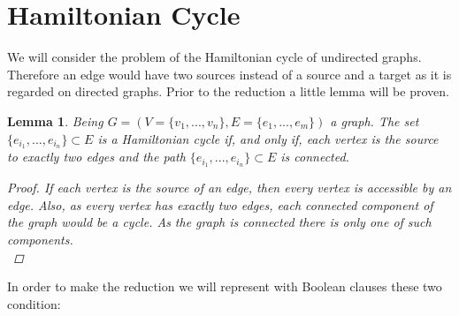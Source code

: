 \documentclass[11pt,a4paper]{article}
\title{}
\author{}
\date{}
\newtheorem{lemma}[theorem]{Lemma}
\theoremstyle{definition}
\begin{document}
\maketitle
\section{Hamiltonian Cycle}

We will consider the problem of the Hamiltonian cycle of undirected graphs. Therefore an edge would have two sources instead of a source and a target as it is regarded on directed graphs. Prior to the reduction a little lemma will be proven.

\begin{lemma} Being $G=(V=\{ v_1,...,v_n\},E= \{e_1,...,e_m\})$ a graph. The set $ \{e_{i_1},...,e_{i_n}\}\subset E$ is a Hamiltonian cycle if, and only if, each vertex is the source to exactly two edges and the path  $ \{e_{i_1},...,e_{i_n}\}\subset E$ is connected.

\begin{proof}
	If each vertex is the source of an edge, then every vertex is accessible by an edge. Also, as every vertex has exactly two edges, each connected component of the graph would be a cycle. As the graph is connected there is only one of such components.\\
\end{proof}
	
\end{lemma}


In order to make the reduction we will represent with Boolean clauses these two condition:
\end{document}

